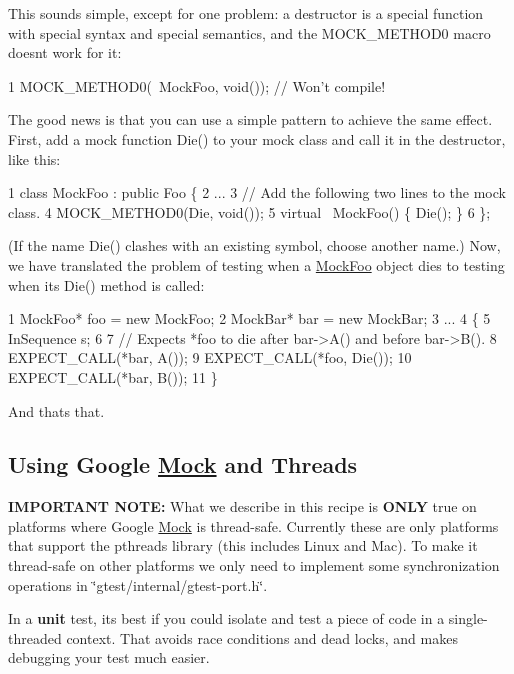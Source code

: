 This sounds simple, except for one problem\+: a destructor is a special function with special syntax and special semantics, and the {\ttfamily M\+O\+C\+K\+\_\+\+M\+E\+T\+H\+O\+D0} macro doesn\textquotesingle{}t work for it\+:


\begin{DoxyCode}
1 MOCK\_METHOD0(~MockFoo, void());  // Won't compile!
\end{DoxyCode}


The good news is that you can use a simple pattern to achieve the same effect. First, add a mock function {\ttfamily Die()} to your mock class and call it in the destructor, like this\+:


\begin{DoxyCode}
1 class MockFoo : public Foo \{
2   ...
3   // Add the following two lines to the mock class.
4   MOCK\_METHOD0(Die, void());
5   virtual ~MockFoo() \{ Die(); \}
6 \};
\end{DoxyCode}


(If the name {\ttfamily Die()} clashes with an existing symbol, choose another name.) Now, we have translated the problem of testing when a {\ttfamily \hyperlink{class_mock_foo}{Mock\+Foo}} object dies to testing when its {\ttfamily Die()} method is called\+:


\begin{DoxyCode}
1 MockFoo* foo = new MockFoo;
2 MockBar* bar = new MockBar;
3 ...
4 \{
5   InSequence s;
6 
7   // Expects *foo to die after bar->A() and before bar->B().
8   EXPECT\_CALL(*bar, A());
9   EXPECT\_CALL(*foo, Die());
10   EXPECT\_CALL(*bar, B());
11 \}
\end{DoxyCode}


And that\textquotesingle{}s that.

\subsection*{Using Google \hyperlink{class_mock}{Mock} and Threads}

{\bfseries I\+M\+P\+O\+R\+T\+A\+NT N\+O\+TE\+:} What we describe in this recipe is {\bfseries O\+N\+LY} true on platforms where Google \hyperlink{class_mock}{Mock} is thread-\/safe. Currently these are only platforms that support the pthreads library (this includes Linux and Mac). To make it thread-\/safe on other platforms we only need to implement some synchronization operations in {\ttfamily \char`\"{}gtest/internal/gtest-\/port.\+h\char`\"{}}.

In a {\bfseries unit} test, it\textquotesingle{}s best if you could isolate and test a piece of code in a single-\/threaded context. That avoids race conditions and dead locks, and makes debugging your test much easier.

